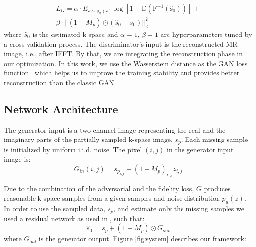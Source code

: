 \documentclass[review]{elsarticle}
\begin{document}
\begin{equation}
\begin{aligned}L_{G}=\alpha\cdot E_{\mathrm{z\sim p_{u}\left(z\right)}}\mathrm{\log\left[1-D\left(F^{-1}\left(\hat{s}_{0}\right)\right)\right]}+\\
\beta\cdot||\left(1-M_{p}\right)\odot\left(\hat{s}_{0}-s_{0}\right)||_{2}^{2}
\end{aligned}
\end{equation}
where $\hat{s}_{0}$ is the estimated k-space and $\alpha=1,\,\beta=1$ are hyperparameters tuned by a cross-validation process. The discriminator's input is the reconstructed MR image,\textbf{ }i.e.,\textbf{ }after IFFT. By that, we are integrating the reconstruction phase in our optimization.
In this work, we use the Wasserstein distance as the GAN loss function~\cite{arjovsky2017wasserstein} which helps us to improve the training stability and provides better reconstruction than the classic GAN.

\subsection{Network Architecture}

The generator input is a two-channel image representing the real and the imaginary parts of the partially sampled k-space image, $s_{p}$. Each missing sample is initialized by uniform i.i.d. noise. The pixel $\left(i,j\right)$ in the generator input image is: 
\begin{equation}
G_{in}\left(i,j\right)=s_{p_{i,j}}+\left(1-M_{p}\right)_{i,j}z_{i,j}
\end{equation}

Due to the combination of the adversarial and the fidelity loss, $G$ produces reasonable k-space samples from a given samples and noise distribution $p_{u}\left(z\right)$. In order to use the sampled data, $s_{p}$, and estimate only the missing samples we used a residual network \cite{he2016deep} as used in \cite{Oktay2016}, such that:
\begin{equation}
\hat{s}_{0}=s_{p}+\left(1-M_{p}\right)\odot G_{out}
\end{equation}
where $G_{out}$ is the generator output. Figure \ref{fig:system} describes our framework:

\end{document}
